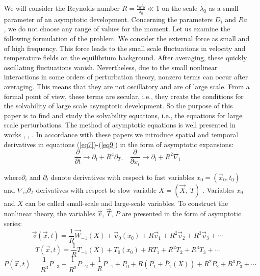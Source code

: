 \documentclass [12pt]{article}
\begin{document}
We will consider the Reynolds number $R=\frac{v_{0} t_{0} }{\lambda _{0} }  \ll 1$  on the scale $\lambda _{0} $ as a small parameter of an asymptotic development. Concerning the parameters $D_{i} $ and  $Ra$ , we do not choose any range of values for the moment. Let us examine the following formulation of the problem. We consider the external force as small and of high frequency. This force leads to the small scale fluctuations in velocity and temperature fields on the equilibrium background. After averaging, these quickly oscillating fluctuations vanish. Nevertheless, due to the small nonlinear interactions in some orders of perturbation theory, nonzero terms can occur after averaging. This means that they are not oscillatory and are of large scale. From a formal point of view, these terms are secular, i.e., they create the conditions for the solvability of large scale asymptotic development. So the purpose of this paper is to find and study the solvability equations, i.e., the equations for large scale perturbations. The method of asymptotic equations is well presented in works \cite{7s}, \cite{14s}, \cite{15s}. In accordance with these papers we introduce spatial and temporal derivatives in equations (\ref{eq7})-(\ref{eq9}) in the form of asymptotic expansions:
\begin{equation} \label{eq10}
 \frac{\partial }{\partial t} \to \partial _{t}
+R^{4} \partial _{T}, \;\;\; \frac{\partial }{\partial x_{i} } \to \partial _{i} +R^{2}
\nabla _{i}
\end{equation}

where$\partial _{i} $ and  $\partial _{t} $ denote derivatives with respect to fast variables $x_{0} =\left(\vec{x}_{0} ,t_{0} \right)$  and $\nabla _{i} $,$\partial _{T} $ derivatives    with respect to slow variable $X=\left(\vec{X},\; T\right)$ . Variables $x_{0} $ and   $X$ can be called small-scale and large-scale variables. To construct the nonlinear theory, the variables $\vec{v}$, $\vec{T}$, $P$  are presented in the form of asymptotic series:
\[\vec{v}(\vec{x},t) =\frac{1}{R} \vec{W}_{-1} \left(X\right)+\vec{v}_{0} \left(x_{0} \right)+R\vec{v}_{1} +R^{2} \vec{v}_{2} +R^{3} \vec{v}_{3}+\cdots  \]
\begin{equation} \label{eq11}
T(\vec{x},t)=\frac{1}{R} T_{-1} \left(X\right)+T_{0} \left(x_{0} \right)+RT_{1} +R^{2} T_{2} +R^{3} T_{3} +\cdots
\end{equation}
\[P(\vec{x},t)=\frac{1}{R^{3} } P_{-3} +\frac{1}{R^{2} } P_{-2} +\frac{1}{R} P_{-1} +P_{0} +R(P_{1} +\overline{P}_{1} \left(X\right))+R^{2} P_{2} +R^{3} P_{3} +\cdots\]
\end{document}
